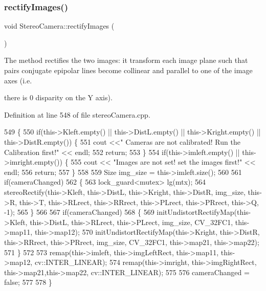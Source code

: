 \mbox{\label{classStereoCamera_ae5ac866c6d4b6c4819b01a918e7b61e0}} 
\subsubsection{\texorpdfstring{rectify\+Images()}{rectifyImages()}}
{\footnotesize\ttfamily void Stereo\+Camera\+::rectify\+Images (\begin{DoxyParamCaption}{ }\end{DoxyParamCaption})}



The method rectifies the two images\+: it transform each image plane such that pairs conjugate epipolar lines become collinear and parallel to one of the image axes (i.\+e. 

there is 0 disparity on the Y axis). 

Definition at line 548 of file stereo\+Camera.\+cpp.


\begin{DoxyCode}
549 \{
550     \textcolor{keywordflow}{if}(this->Kleft.empty() || this->DistL.empty() || this->Kright.empty() || this->DistR.empty()) \{
551         cout <<\textcolor{stringliteral}{" Cameras are not calibrated! Run the Calibration first!"} << endl;
552         \textcolor{keywordflow}{return};
553     \}
554     \textcolor{keywordflow}{if}(this->imleft.empty() || this->imright.empty()) \{
555         cout << \textcolor{stringliteral}{"Images are not set! set the images first!"} << endl;
556         \textcolor{keywordflow}{return};
557     \}
558 
559     Size img\_size = this->imleft.size();
560 
561     \textcolor{keywordflow}{if}(cameraChanged)
562     \{
563         lock\_guard<mutex> lg(mtx);
564         stereoRectify(this->Kleft, this->DistL, this->Kright, this->DistR, img\_size, this->R, this->T, 
      this->RLrect, this->RRrect, this->PLrect, this->PRrect, this->Q, -1);
565     \}
566 
567     \textcolor{keywordflow}{if}(cameraChanged)
568     \{
569         initUndistortRectifyMap(this->Kleft, this->DistL, this->RLrect, this->PLrect, img\_size, CV\_32FC1, 
      this->map11, this->map12);
570         initUndistortRectifyMap(this->Kright,  this->DistR, this->RRrect, this->PRrect, img\_size, CV\_32FC1,
       this->map21, this->map22);
571     \}
572 
573     remap(this->imleft, this->imgLeftRect, this->map11, this->map12, cv::INTER\_LINEAR);
574     remap(this->imright, this->imgRightRect, this->map21,this->map22, cv::INTER\_LINEAR);
575 
576     cameraChanged = \textcolor{keyword}{false};
577 
578 \}
\end{DoxyCode}
\mbox{\label{classStereoCamera_ac92ce0b90b69773284be5825b0199bda}} 
